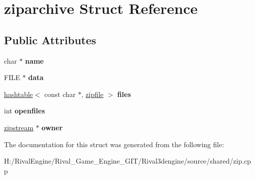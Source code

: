 \hypertarget{structziparchive}{}\section{ziparchive Struct Reference}
\label{structziparchive}
\subsection*{Public Attributes}
\begin{DoxyCompactItemize}
\item 
\mbox{\label{structziparchive_a2a81435bb1f03255fe257cacd9c532a4}} 
char $\ast$ {\bfseries name}
\item 
\mbox{\label{structziparchive_a7c3e9ab3f2a102fe9a1b6ac2fa0c6d37}} 
F\+I\+LE $\ast$ {\bfseries data}
\item 
\mbox{\label{structziparchive_ab5856bb94fd9d45b43852504d5923cfc}} 
\hyperlink{structhashtable}{hashtable}$<$ const char $\ast$, \hyperlink{structzipfile}{zipfile} $>$ {\bfseries files}
\item 
\mbox{\label{structziparchive_a22570d50a6864562b0da2a4c6aa85526}} 
int {\bfseries openfiles}
\item 
\mbox{\label{structziparchive_aa7f1c555fa009b2bf693ae32b8d14ed3}} 
\hyperlink{structzipstream}{zipstream} $\ast$ {\bfseries owner}
\end{DoxyCompactItemize}


The documentation for this struct was generated from the following file\+:\begin{DoxyCompactItemize}
\item 
H\+:/\+Rival\+Engine/\+Rival\+\_\+\+Game\+\_\+\+Engine\+\_\+\+G\+I\+T/\+Rival3dengine/source/shared/zip.\+cpp\end{DoxyCompactItemize}
